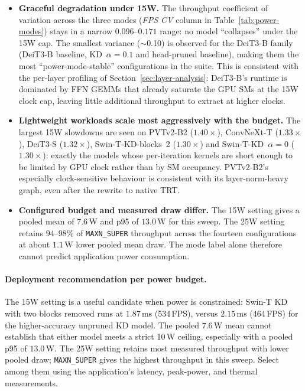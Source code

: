 \documentclass[runningheads,a4paper]{llncs}
\begin{document}
\begin{itemize}
    \item \textbf{Graceful degradation under 15W.} The throughput coefficient of variation across the three modes (\textit{FPS CV} column in Table~\ref{tab:power-modes}) stays in a narrow $0.096$--$0.171$ range: no model ``collapses'' under the 15W cap. The smallest variance ($\sim$0.10) is observed for the DeiT3-B family (DeiT3-B baseline, KD~$\alpha{=}0.1$ and head-pruned baseline), making them the most ``power-mode-stable'' configurations in the suite. This is consistent with the per-layer profiling of Section~\ref{sec:layer-analysis}: DeiT3-B's runtime is dominated by FFN GEMMs that already saturate the GPU SMs at the 15W clock cap, leaving little additional throughput to extract at higher clocks.
    \item \textbf{Lightweight workloads scale most aggressively with the budget.} The largest 15W slowdowns are seen on PVTv2-B2 ($1.40\times$), ConvNeXt-T ($1.33\times$), DeiT3-S ($1.32\times$), Swin-T-KD-blocks~2 ($1.30\times$) and Swin-T-KD~$\alpha{=}0$ ($1.30\times$): exactly the models whose per-iteration kernels are short enough to be limited by GPU clock rather than by SM occupancy. PVTv2-B2's especially clock-sensitive behaviour is consistent with its layer-norm-heavy graph, even after the rewrite to native TRT.
    \item \textbf{Configured budget and measured draw differ.} The 15W setting gives a pooled mean of $7.6$\,W and p95 of $13.0$\,W for this sweep. The 25W setting retains $94$--$98\%$ of \texttt{MAXN\_SUPER} throughput across the fourteen configurations at about $1.1$\,W lower pooled mean draw. The mode label alone therefore cannot predict application power consumption.
\end{itemize}

\paragraph{Deployment recommendation per power budget.} The 15W setting is a useful candidate when power is constrained: Swin-T KD with two blocks removed runs at $1.87$\,ms (534\,FPS), versus $2.15$\,ms (464\,FPS) for the higher-accuracy unpruned KD model. The pooled $7.6$\,W mean cannot establish that either model meets a strict 10\,W ceiling, especially with a pooled p95 of $13.0$\,W. The 25W setting retains most measured throughput with lower pooled draw; \texttt{MAXN\_SUPER} gives the highest throughput in this sweep. Select among them using the application's latency, peak-power, and thermal measurements.
\end{document}
